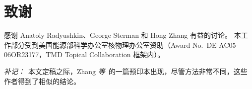 \section*{致谢}
\label{sec:acknowledgments}

感谢 Anatoly Radyushkin、George Sterman 和 Hong Zhang 有益的讨论。
本工作部分受到美国能源部科学办公室核物理办公室资助（Award No.~DE-AC05-06OR23177，TMD Topical Collaboration 框架内）。

{\it 补记：}\ 本文定稿之际，Zhang {\it 等}~\cite{Zhang:2018diq}的一篇预印本出现，尽管方法非常不同，这些作者得到了相似的结论。


